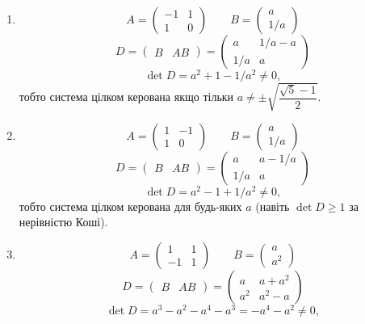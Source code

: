 \begin{solution}
    \begin{enumerate}
        \item \[ A = \begin{pmatrix} -1 & 1 \\ 1 & 0 \end{pmatrix} \qquad B = \begin{pmatrix} a \\ 1 / a \end{pmatrix} \]
        \[ D = \begin{pmatrix} B & AB \end{pmatrix} = \begin{pmatrix} a & 1 / a - a \\ 1 / a & a \end{pmatrix} \]
        \[ \det D = a^2 + 1 - 1/a^2 \ne 0, \]
        тобто система цілком керована якщо тільки $a \ne \pm \sqrt{\dfrac{\sqrt{5} - 1}{2}}$.
        \item \[ A = \begin{pmatrix} 1 & -1 \\ 1 & 0 \end{pmatrix} \qquad B = \begin{pmatrix} a \\ 1 / a \end{pmatrix} \]
        \[ D = \begin{pmatrix} B & AB \end{pmatrix} = \begin{pmatrix} a & a - 1 / a \\ 1 / a & a \end{pmatrix} \]
        \[ \det D = a^2 - 1 + 1/a^2 \ne 0, \]
        тобто система цілком керована для будь-яких $a$ (навіть $\det D \ge 1$ за нерівністю Коші).
        \item \[ A = \begin{pmatrix} 1 & 1 \\ -1 & 1 \end{pmatrix} \qquad B = \begin{pmatrix} a \\ a^2 \end{pmatrix} \]
        \[ D = \begin{pmatrix} B & AB \end{pmatrix} = \begin{pmatrix} a & a + a^2 \\ a^2 & a^2 - a \end{pmatrix} \]
        \[ \det D = a^3 - a^2 - a^4 - a^3 = -a^4 - a^2 \ne 0, \]

\end{enumerate}
\end{solution}
